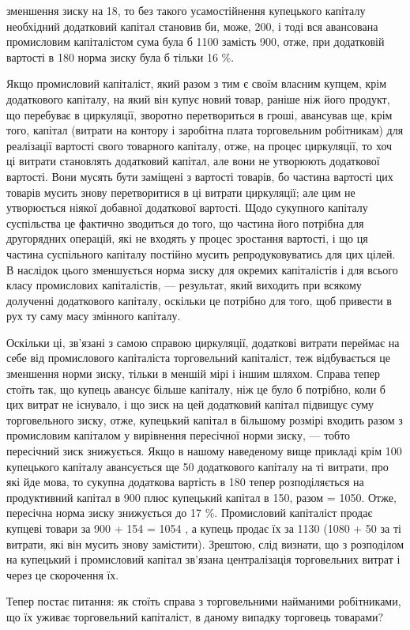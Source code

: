 \parcont{}  %
зменшення зиску на 18, то без такого усамостійнення купецького
капіталу необхідний додатковий капітал становив би, може, 200,
і тоді вся авансована промисловим капіталістом сума була б 1100
замість 900, отже, при додатковій вартості в 180 норма зиску
була б тільки 16 \%.

Якщо промисловий капіталіст, який разом з тим є своїм
власним купцем, крім додаткового капіталу, на який він купує
новий товар, раніше ніж його продукт, що перебуває в циркуляції,
зворотно перетвориться в гроші, авансував ще, крім того,
капітал (витрати на контору і заробітна плата торговельним
робітникам) для реалізації вартості свого товарного капіталу,
отже, на процес циркуляції, то хоч ці витрати становлять
додатковий капітал, але вони не утворюють додаткової вартості.
Вони мусять бути заміщені з вартості товарів, бо частина
вартості цих товарів мусить знову перетворитися в ці витрати
циркуляції; але цим не утворюється ніякої добавної додаткової
вартості. Щодо сукупного капіталу суспільства це фактично
зводиться до того, що частина його потрібна для другорядних
операцій, які не входять у процес зростання вартості, і що ця
частина суспільного капіталу постійно мусить репродуковуватись
для цих цілей. В наслідок цього зменшується норма зиску
для окремих капіталістів і для всього класу промислових капіталістів,
— результат, який виходить при всякому долученні
додаткового капіталу, оскільки це потрібно для того, щоб привести
в рух ту саму масу змінного капіталу.

Оскільки ці, зв’язані з самою справою циркуляції, додаткові
витрати переймає на себе від промислового капіталіста торговельний
капіталіст, теж відбувається це зменшення норми зиску,
тільки в меншій мірі і іншим шляхом. Справа тепер стоїть так,
що купець авансує більше капіталу, ніж це було б потрібно,
коли б цих витрат не існувало, і що зиск на цей додатковий
капітал підвищує суму торговельного зиску, отже, купецький
капітал в більшому розмірі входить разом з промисловим капіталом
у вирівнення пересічної норми зиску, — тобто пересічний
зиск знижується. Якщо в нашому наведеному вище прикладі крім
100 купецького капіталу авансується ще 50 додаткового капіталу
на ті витрати, про які йде мова, то сукупна додаткова
вартість в 180 тепер розподіляється на продуктивний капітал
в 900 плюс купецький капітал в 150, разом = 1050. Отже, пересічна
норма зиску знижується до 17 \%. Промисловий капіталіст
продає купцеві товари за 900 + 154  = 1054 , а купець
продає їх за 1130 (1080 + 50 за ті витрати, які він мусить знову
замістити). Зрештою, слід визнати, що з розподілом на купецький
і промисловий капітал зв’язана централізація торговельних
витрат і через це скорочення їх.

Тепер постає питання: як стоїть справа з торговельними
найманими робітниками, що їх уживає торговельний капіталіст,
в даному випадку торговець товарами?
